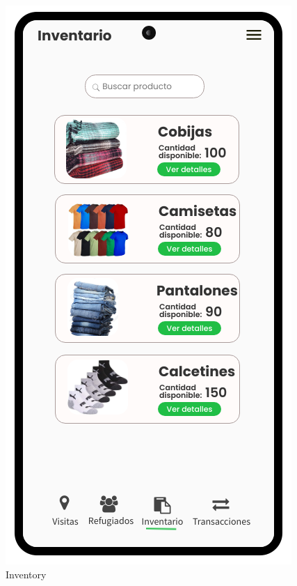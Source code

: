 \documentclass{scrreprt}
\begin{document}
\begin{figure}[H]
   \begin{minipage}{0.48\textwidth}
     \centering
     \includegraphics[width=.7\linewidth]{Inventario}
     \caption{Inventory}\label{Fig:Data1}
   \end{minipage}\hfill
   \begin{minipage}{0.48\textwidth}
     \centering

\end{minipage}
\end{figure}
\end{document}
